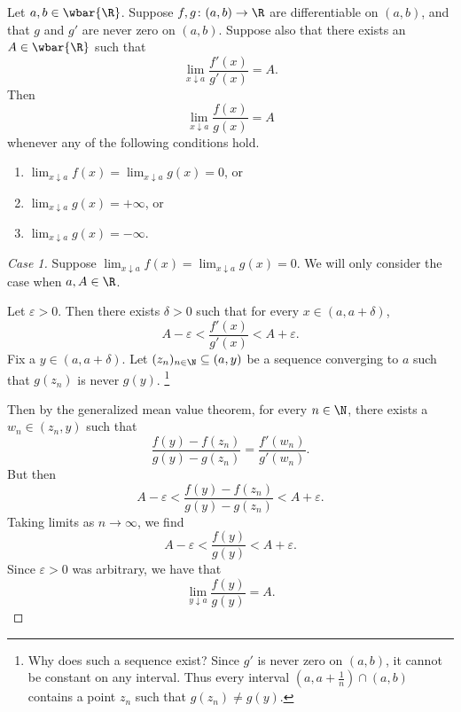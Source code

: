 \begin{theorem*} \label{thm:lhopital}
    Let $a, b \in \wbar{\R}$.
    Suppose $f, g\colon (a, b) \to \R$ are differentiable on $(a, b)$,
    and that $g$ and $g'$ are never zero on $(a, b)$.
    Suppose also that there exists an $A \in \wbar{\R}$ such that \[
        \lim_{x \downarrow a} \frac{f'(x)}{g'(x)} = A.
    \] Then \[
        \lim_{x \downarrow a} \frac{f(x)}{g(x)} = A
    \] whenever any of the following conditions hold.
    \begin{enumerate}
        \item $\lim_{x \downarrow a} f(x) = \lim_{x \downarrow a} g(x) = 0$, or
        \item $\lim_{x \downarrow a} g(x) = +\infty$, or
        \item $\lim_{x \downarrow a} g(x) = -\infty$.
    \end{enumerate}
\end{theorem*}
\begin{proof}[Case 1]
    Suppose $\lim_{x \downarrow a} f(x) = \lim_{x \downarrow a} g(x) = 0$.
    We will only consider the case when $a, A \in \R$.

    Let $\varepsilon > 0$.
    Then there exists $\delta > 0$ such that
    for every $x \in (a, a + \delta)$, \[
        A - \varepsilon < \frac{f'(x)}{g'(x)} < A + \varepsilon.
    \] Fix a $y \in (a, a + \delta)$.
    Let $(z_n)_{n \in \N} \subseteq (a, y)$ be a sequence converging to
    $a$ such that $g(z_n)$ is never $g(y)$.%
    \footnote{Why does such a sequence exist?
    Since $g'$ is never zero on $(a, b)$,
    it cannot be constant on any interval.
    Thus every interval $(a, a+\frac1n) \cap (a, b)$ contains a point $z_n$
    such that $g(z_n) \ne g(y)$.}

    Then by the generalized mean value theorem, for every $n \in \N$,
    there exists a $w_n \in (z_n, y)$ such that \[
        \frac{f(y) - f(z_n)}{g(y) - g(z_n)} = \frac{f'(w_n)}{g'(w_n)}.
    \] But then \[
        A - \varepsilon
            < \frac{f(y) - f(z_n)}{g(y) - g(z_n)}
                < A + \varepsilon.
    \] Taking limits as $n \to \infty$, we find \[
        A - \varepsilon < \frac{f(y)}{g(y)} < A + \varepsilon.
    \] Since $\varepsilon > 0$ was arbitrary, we have that \[
        \lim_{y \downarrow a} \frac{f(y)}{g(y)} = A.
    \]
\end{proof}
